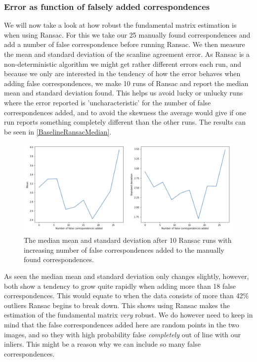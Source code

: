 \subsubsection{Error as function of falsely added correspondences}
We will now take a look at how robust the fundamental matrix estimation is when using Ransac. For this we take our 25 manually found correspondences and add a number of false correspondence before running Ransac. We then measure the mean and standard deviation of the scanline agreement error. As Ransac is a non-deterministic algorithm we might get rather different errors each run, and because we only are interested in the tendency of how the error behaves when adding false correspondences, we make 10 runs of Ransac and report the median mean and standard deviation found. This helps us avoid lucky or unlucky runs where the error reported is 'uncharacteristic' for the number of false correspondences added, and to avoid the skewness the average would give if one run reports something completely different than the other runs. The results can be seen in \autoref{BaselineRansacMedian}.

\begin{figure}[h]
	\centering
	\includegraphics[width=\linewidth]{Materials/BaselineRansacMedian}
	\caption{The median mean and standard deviation after 10 Ransac runs with increasing number of false correspondences added to the manually found correspondences.}
	\label{BaselineRansacMedian}
\end{figure}
As seen the median mean and standard deviation only changes slightly, however, both show a tendency to grow quite rapidly when adding more than 18 false correspondences. This would equate to when the data consists of more than 42\% outliers Ransac begins to break down. This shows using Ransac makes the estimation of the fundamental matrix \textit{very} robust. We do however need to keep in mind that the false correspondences added here are random points in the two images, and so they with high probability false \textit{completely} out of line with our inliers. This might be a reason why we can include so many false correspondences.

